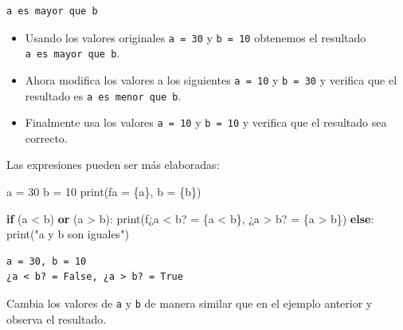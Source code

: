 \documentclass[
  spanish,
  letterpaper,
]{scrbook}
\newenvironment{Shaded}{\begin{snugshade}}{\end{snugshade}}
\newcommand{\BuiltInTok}[1]{\textcolor[rgb]{0.00,0.23,0.31}{#1}}
\newcommand{\ControlFlowTok}[1]{\textcolor[rgb]{0.00,0.23,0.31}{\textbf{#1}}}
\newcommand{\DecValTok}[1]{\textcolor[rgb]{0.68,0.00,0.00}{#1}}
\newcommand{\KeywordTok}[1]{\textcolor[rgb]{0.00,0.23,0.31}{\textbf{#1}}}
\newcommand{\NormalTok}[1]{\textcolor[rgb]{0.00,0.23,0.31}{#1}}
\newcommand{\OperatorTok}[1]{\textcolor[rgb]{0.37,0.37,0.37}{#1}}
\newcommand{\SpecialCharTok}[1]{\textcolor[rgb]{0.37,0.37,0.37}{#1}}
\newcommand{\SpecialStringTok}[1]{\textcolor[rgb]{0.13,0.47,0.30}{#1}}
\newcommand{\StringTok}[1]{\textcolor[rgb]{0.13,0.47,0.30}{#1}}
\providecommand{\tightlist}{%
  \setlength{\itemsep}{0pt}\setlength{\parskip}{0pt}}
\theoremstyle{definition}
\theoremstyle{remark}
\begin{document}
\begin{verbatim}
a es mayor que b
\end{verbatim}

\begin{itemize}
\tightlist
\item
  Usando los valores originales \texttt{a\ =\ 30} y \texttt{b\ =\ 10}
  obtenemos el resultado \texttt{a\ es\ mayor\ que\ b}.
\item
  Ahora modifica los valores a los siguientes \texttt{a\ =\ 10} y
  \texttt{b\ =\ 30} y verifica que el resultado es
  \texttt{a\ es\ menor\ que\ b}.
\item
  Finalmente usa los valores \texttt{a\ =\ 10} y \texttt{b\ =\ 10} y
  verifica que el resultado sea correcto.
\end{itemize}

Las expresiones pueden ser más elaboradas:

\begin{Shaded}
\begin{Highlighting}[]
\NormalTok{a }\OperatorTok{=} \DecValTok{30}
\NormalTok{b }\OperatorTok{=} \DecValTok{10}
\BuiltInTok{print}\NormalTok{(}\SpecialStringTok{f\textquotesingle{}a = }\SpecialCharTok{\{}\NormalTok{a}\SpecialCharTok{\}}\SpecialStringTok{, b = }\SpecialCharTok{\{}\NormalTok{b}\SpecialCharTok{\}}\SpecialStringTok{\textquotesingle{}}\NormalTok{)}

\ControlFlowTok{if}\NormalTok{ (a }\OperatorTok{\textless{}}\NormalTok{ b) }\KeywordTok{or}\NormalTok{ (a }\OperatorTok{\textgreater{}}\NormalTok{ b):}
    \BuiltInTok{print}\NormalTok{(}\SpecialStringTok{f\textquotesingle{}¿a \textless{} b? = }\SpecialCharTok{\{}\NormalTok{a }\OperatorTok{\textless{}}\NormalTok{ b}\SpecialCharTok{\}}\SpecialStringTok{, ¿a \textgreater{} b? = }\SpecialCharTok{\{}\NormalTok{a }\OperatorTok{\textgreater{}}\NormalTok{ b}\SpecialCharTok{\}}\SpecialStringTok{\textquotesingle{}}\NormalTok{)}
\ControlFlowTok{else}\NormalTok{:}
    \BuiltInTok{print}\NormalTok{(}\StringTok{"a y b son iguales"}\NormalTok{)}
\end{Highlighting}
\end{Shaded}

\begin{verbatim}
a = 30, b = 10
¿a < b? = False, ¿a > b? = True
\end{verbatim}

Cambia los valores de \texttt{a} y \texttt{b} de manera similar que en
el ejemplo anterior y observa el resultado.
\end{document}
